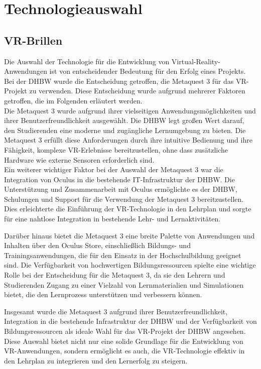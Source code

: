 \chapter{Technologieauswahl}
\section{VR-Brillen}
Die Auswahl der Technologie für die Entwicklung von Virtual-Reality-Anwendungen ist von entscheidender Bedeutung für den Erfolg eines Projekts. Bei der DHBW wurde die Entscheidung getroffen, die Metaquest 3 für das VR-Projekt zu verwenden. Diese Entscheidung wurde aufgrund mehrerer Faktoren getroffen, die im Folgenden erläutert werden.
\\

\noindent
Die Metaquest 3 wurde aufgrund ihrer vielseitigen Anwendungsmöglichkeiten und ihrer Benutzerfreundlichkeit ausgewählt. Die DHBW legt großen Wert darauf, den Studierenden eine moderne und zugängliche Lernumgebung zu bieten. Die Metaquest 3 erfüllt diese Anforderungen durch ihre intuitive Bedienung und ihre Fähigkeit, komplexe VR-Erlebnisse bereitzustellen, ohne dass zusätzliche Hardware wie externe Sensoren erforderlich sind.
\\

\noindent
Ein weiterer wichtiger Faktor bei der Auswahl der Metaquest 3 war die Integration von Oculus in die bestehende IT-Infrastruktur der DHBW. Die Unterstützung und Zusammenarbeit mit Oculus ermöglichte es der DHBW, Schulungen und Support für die Verwendung der Metaquest 3 bereitzustellen. Dies erleichterte die Einführung der VR-Technologie in den Lehrplan und sorgte für eine nahtlose Integration in bestehende Lehr- und Lernaktivitäten.

Darüber hinaus bietet die Metaquest 3 eine breite Palette von Anwendungen und Inhalten über den Oculus Store, einschließlich Bildungs- und Trainingsanwendungen, die für den Einsatz in der Hochschulbildung geeignet sind. Die Verfügbarkeit von hochwertigen Bildungsressourcen spielte eine wichtige Rolle bei der Entscheidung für die Metaquest 3, da sie den Lehrern und Studierenden Zugang zu einer Vielzahl von Lernmaterialien und Simulationen bietet, die den Lernprozess unterstützen und verbessern können.

Insgesamt wurde die Metaquest 3 aufgrund ihrer Benutzerfreundlichkeit, Integration in die bestehende Infrastruktur der DHBW und der Verfügbarkeit von Bildungsressourcen als ideale Wahl für das VR-Projekt der DHBW angesehen. Diese Auswahl bietet nicht nur eine solide Grundlage für die Entwicklung von VR-Anwendungen, sondern ermöglicht es auch, die VR-Technologie effektiv in den Lehrplan zu integrieren und den Lernerfolg zu steigern.
